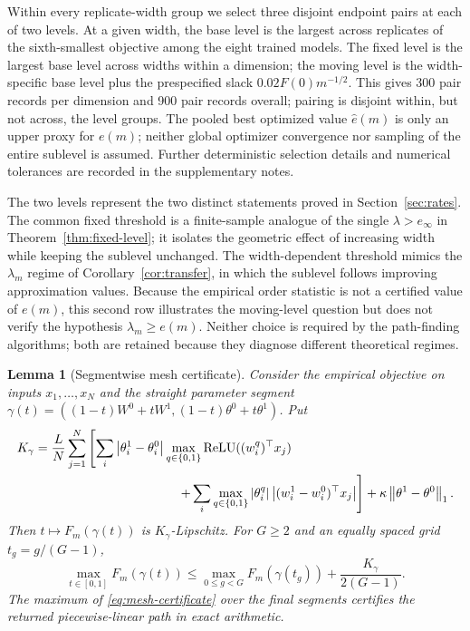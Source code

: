 \documentclass[pdflatex,sn-mathphys-num]{sn-jnl}
\theoremstyle{thmstyleone}
\newtheorem{lemma}[theorem]{Lemma}
\theoremstyle{thmstyletwo}
\theoremstyle{thmstylethree}
\newcommand{\relu}{\operatorname{ReLU}}
\newcommand{\norm}[1]{\left\lVert #1 \right\rVert}
\newcommand{\abs}[1]{\left\lvert #1 \right\rvert}
\begin{document}
Within every replicate-width group we select three disjoint endpoint pairs at each of two levels. At a given width, the base level is the largest across replicates of the sixth-smallest objective among the eight trained models. The fixed level is the largest base level across widths within a dimension; the moving level is the width-specific base level plus the prespecified slack $0.02F(0)m^{-1/2}$. This gives 300 pair records per dimension and 900 pair records overall; pairing is disjoint within, but not across, the level groups. The pooled best optimized value $\widehat e(m)$ is only an upper proxy for $e(m)$; neither global optimizer convergence nor sampling of the entire sublevel is assumed. Further deterministic selection details and numerical tolerances are recorded in the supplementary notes.

The two levels represent the two distinct statements proved in Section~\ref{sec:rates}. The common fixed threshold is a finite-sample analogue of the single $\lambda>e_\infty$ in Theorem~\ref{thm:fixed-level}; it isolates the geometric effect of increasing width while keeping the sublevel unchanged. The width-dependent threshold mimics the $\lambda_m$ regime of Corollary~\ref{cor:transfer}, in which the sublevel follows improving approximation values. Because the empirical order statistic is not a certified value of $e(m)$, this second row illustrates the moving-level question but does not verify the hypothesis $\lambda_m\ge e(m)$. Neither choice is required by the path-finding algorithms; both are retained because they diagnose different theoretical regimes.

\begin{lemma}[Segmentwise mesh certificate]\label{lem:dss-certificate}
Consider the empirical objective on inputs $x_1,\ldots,x_N$ and the straight parameter segment
$\gamma(t)=((1-t)W^0+tW^1,(1-t)\theta^0+t\theta^1)$. Put
\begin{align}
K_\gamma={}&\frac{L}{N}\sum_{j=1}^N\left[
\sum_i\abs{\theta_i^1-\theta_i^0}
\max_{q\in\{0,1\}}\relu((w_i^q)^\top x_j)\right.\notag\\
&\left.\hspace{35mm}+
\sum_i\max_{q\in\{0,1\}}\abs{\theta_i^q}
\abs{(w_i^1-w_i^0)^\top x_j}
\right]
+\kappa\norm{\theta^1-\theta^0}_1.
\label{eq:segment-lipschitz}
\end{align}
Then $t\mapsto F_m(\gamma(t))$ is $K_\gamma$-Lipschitz. For $G\ge2$ and an equally spaced grid $t_g=g/(G-1)$,
\begin{equation}
\max_{t\in[0,1]}F_m(\gamma(t))
\le \max_{0\le g<G}F_m(\gamma(t_g))
+\frac{K_\gamma}{2(G-1)}.
\label{eq:mesh-certificate}
\end{equation}
The maximum of \eqref{eq:mesh-certificate} over the final segments certifies the returned piecewise-linear path in exact arithmetic.
\end{lemma}
\end{document}
